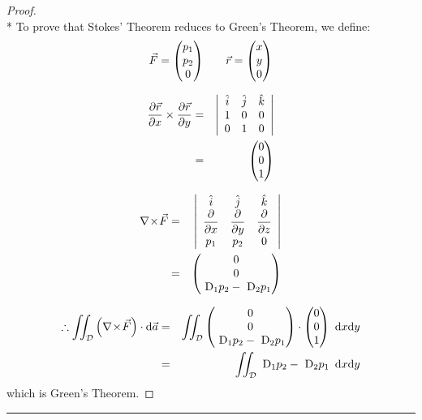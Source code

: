 \documentclass[10pt,a4paper]{report}
\theoremstyle{definition}
\theoremstyle{plain}
\theoremstyle{definition}
\theoremstyle{plain}
\newcommand{\dd}{\mathop{}\,\mathrm{d}}
\newcommand{\DD}{\mathop{}\,\mathrm{D}}
\newcommand{\ddns}{\mathrm{d}}
\newcommand{\parderiv}[2]{\dfrac{\partial #1}{\partial #2}}
\newenvironment{colvectorenvironment}{\left(\!\!\!\begin{array}{c}}{\end{array}\!\!\!\right)}
\newenvironment{proofenv}{\begin{proof}}{\end{proof}{\par\centering\rule{3cm}{.1pt}\par}}
\newcommand{\domain}{\mathcal{D}}
\newcommand{\curl}[1]{\nabla\!\times\!#1}
\newcommand{\colvector}[1]{\begin{colvectorenvironment}#1\end{colvectorenvironment}}
\begin{document}
\begin{proofenv}\ \\*
    To prove that Stokes' Theorem reduces to Green's Theorem, we define:
    \[
        \vec{F} = \begin{colvectorenvironment}p_1\\p_2\\0\end{colvectorenvironment}
        \qquad
        \vec{r} = \begin{colvectorenvironment}x\\y\\0\end{colvectorenvironment}
    \]
    
    \begin{eqnarray*}
        \parderiv{\vec{r}}{x} \times \parderiv{\vec{r}}{y} &=&
            \left|\begin{array}{ccc}
                \hat{i} &   \hat{j} &   \hat{k} \\
                1       &   0       &   0       \\
                0       &   1       &   0
            \end{array}\right| \\
        &=& \colvector{0\\0\\1}
    \end{eqnarray*}
    
    \begin{eqnarray*}
        \curl{\vec{F}} &=&
            \left|\begin{array}{ccc}
                \hat{i}         &   \hat{j}         &   \hat{k}         \\
                \parderiv{}{x}  &   \parderiv{}{y}  &   \parderiv{}{z}  \\
                p_1             &   p_2             &   0
            \end{array}\right| \\
        &=& \colvector{0\\0\\\DD_1p_2 - \DD_2p_1}
    \end{eqnarray*}
    
    \begin{eqnarray*}
        \therefore \iint_\domain \left( \curl{\vec{F}} \right) \cdot \ddns\vec{a}
        &=& \iint_\domain \colvector{0\\0\\\DD_1p_2 - \DD_2p_1} \cdot \colvector{0\\0\\1} \dd x\ddns y\\
        &=& \iint_\domain \DD_1p_2-\DD_2p_1\dd x\ddns y
    \end{eqnarray*}
    which is Green's Theorem.
\end{proofenv}
\end{document}
